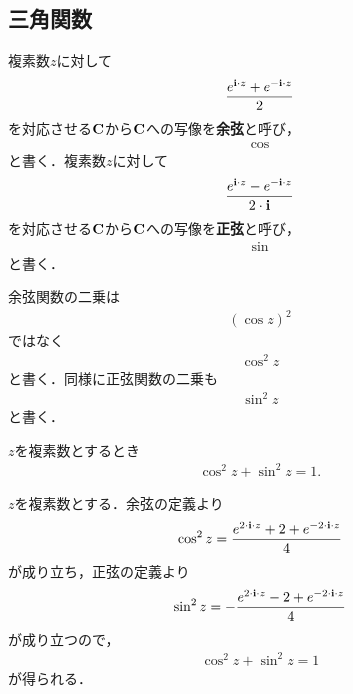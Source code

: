 \subsection{三角関数}
	\begin{screen}
		\begin{dfn}[三角関数]
			複素数$z$に対して
			\begin{align}
				\frac{e^{\mathbf{i} \cdot z} + e^{-\mathbf{i} \cdot z}}{2}
			\end{align}
			を対応させる$\mathbf{C}$から$\mathbf{C}$への写像を{\bf 余弦}と呼び，
			\begin{align}
				\cos
			\end{align}
			と書く．複素数$z$に対して
			\begin{align}
				\frac{e^{\mathbf{i} \cdot z} - e^{-\mathbf{i} \cdot z}}{2 \cdot \mathbf{i}}
			\end{align}
			を対応させる$\mathbf{C}$から$\mathbf{C}$への写像を{\bf 正弦}と呼び，
			\begin{align}
				\sin
			\end{align}
			と書く．
		\end{dfn}
	\end{screen}
	
	余弦関数の二乗は
	\begin{align}
		(\cos{z})^2
	\end{align}
	ではなく
	\begin{align}
		\cos^2{z}
	\end{align}
	と書く．同様に正弦関数の二乗も
	\begin{align}
		\sin^2{z}
	\end{align}
	と書く．
	
	\begin{screen}
		\begin{thm}[余弦と正弦の二乗和は$1$]
			$z$を複素数とするとき
			\begin{align}
				\cos^2{z} + \sin^2{z} = 1.
			\end{align}
		\end{thm}
	\end{screen}
	
	\begin{sketch}
		$z$を複素数とする．余弦の定義より
		\begin{align}
			\cos^2{z} = \frac{e^{2 \cdot \mathbf{i} \cdot z} + 2 + e^{-2 \cdot \mathbf{i} \cdot z}}{4}
		\end{align}
		が成り立ち，正弦の定義より
		\begin{align}
			\sin^2{z} = -\frac{e^{2 \cdot \mathbf{i} \cdot z} - 2 + e^{-2 \cdot \mathbf{i} \cdot z}}{4}
		\end{align}
		が成り立つので，
		\begin{align}
			\cos^2{z} + \sin^2{z} = 1
		\end{align}
		が得られる．
		\QED
	\end{sketch}
	
